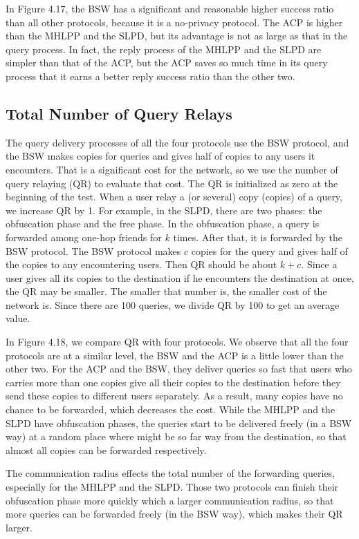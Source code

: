 In Figure 4.17, the BSW has a significant and reasonable higher success ratio than all other protocols, because it is a no-privacy protocol. The ACP is higher than the MHLPP and the SLPD, but its advantage is not as large as that in the query process. In fact, the reply process of the MHLPP and the SLPD are simpler than that of the ACP, but the ACP saves so much time in its query process that it earns a better reply success ratio than the other two.


\subsection{ Total Number of Query Relays}

\noindent The query delivery processes of all the four protocols use the BSW protocol, and the BSW makes copies for queries and gives half of copies to any users it encounters. That is a significant cost for the network, so we use the number of query relaying (QR) to evaluate that cost. The QR is initialized as zero at the beginning of the test. When a user relay a (or several) copy (copies) of a query, we increase QR by 1. For example, in the SLPD, there are two phases: the obfuscation phase and the free phase. In the obfuscation phase, a query is forwarded among one-hop friends for $k$ times. After that, it is forwarded by the BSW protocol. The BSW protocol makes $c$ copies for the query and gives half of the copies to any encountering users. Then QR should be about $k+c$. Since a user gives all its copies to the destination if he encounters the destination at once, the QR may be smaller. The smaller that number is, the smaller cost of the network is. Since there are 100 queries, we divide QR by 100 to get an average value. 

In Figure 4.18, we compare QR with four protocols. We observe that all the four protocols are at a similar level, the BSW and the ACP is a little lower than the other two. For the ACP and the BSW, they deliver queries so fast that users who carries more than one copies give all their copies to the destination before they send these copies to different users separately. As a result, many copies have no chance to be forwarded, which decreases the cost. While the MHLPP and the SLPD have obfuscation phases, the queries start to be delivered freely (in a BSW way) at a random place where might be so far way from the destination, so that almost all copies can be forwarded respectively.

The communication radius effects the total number of the forwarding queries, especially for the MHLPP and the SLPD. Those two protocols can finish their obfuscation phase more quickly which a larger communication radius, so that more queries can be forwarded freely (in the BSW way), which makes their QR larger.

